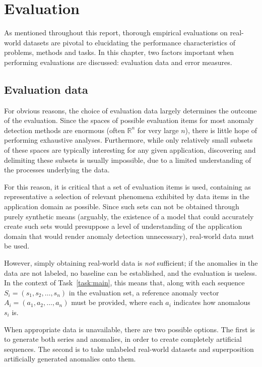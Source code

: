 \chapter{Evaluation}
\label{ch:evaluation}

As mentioned throughout this report, thorough empirical evaluations on real-world datasets are pivotal to elucidating the performance characteristics of problems, methods and tasks. In this chapter, two factors important when performing evaluations are discussed: evaluation data and error measures.

\section{Evaluation data}
\label{sect:evaluation_data}

For obvious reasons, the choice of evaluation data largely determines the outcome of the evaluation. Since the spaces of possible evaluation items for most anomaly detection methods are enormous (often $\mathbb{R}^n$ for very large $n$), there is little hope of performing exhaustive analyses. Furthermore, while only relatively small subsets of these spaces are typically interesting for any given application, discovering and delimiting these subsets is usually impossible, due to a limited understanding of the processes underlying the data.

For this reason, it is critical that a set of evaluation items is used, containing as representative a selection of relevant phenomena exhibited by data items in the application domain as possible. Since such sets can not be obtained through purely synthetic means (arguably, the existence of a model that could accurately create such sets would presuppose a level of understanding of the application domain that would render anomaly detection unnecessary), real-world data must be used.

However, simply obtaining real-world data is \emph{not} sufficient; if the anomalies in the data are not labeled, no baseline can be established, and the evaluation is useless. In the context of Task~\ref{task:main}, this means that, along with each sequence $S_i = (s_1, s_2, \dots, s_n)$ in the evaluation set, a reference anomaly vector $A_i = (a_1, a_2, \dots, a_n)$ must be provided, where each $a_i$ indicates how anomalous $s_i$ is.

When appropriate data is unavailable, there are two possible options. The first is to generate both series and anomalies, in order to create completely artificial sequences. The second is to take unlabeled real-world datasets and superposition artificially generated anomalies onto them.

